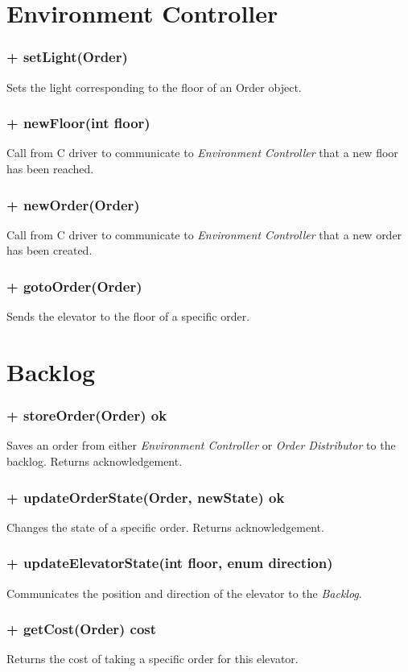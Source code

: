 \documentclass[11pt,a4paper]{article}
\begin{document}
\section*{Environment Controller}
\subsubsection*{+ setLight(Order)}
Sets the light corresponding to the floor of an Order object.
\subsubsection*{+ newFloor(int floor)}
Call from C driver to communicate to \textit{Environment Controller} that a new floor has been reached.
\subsubsection*{+ newOrder(Order)}
Call from C driver to communicate to \textit{Environment Controller} that a new order has been created.
\subsubsection*{+ gotoOrder(Order)}
Sends the elevator to the floor of a specific order.
\section*{Backlog}
\subsubsection*{+ storeOrder(Order) ok}
Saves an order from either \textit{Environment Controller} or \textit{Order Distributor} to the backlog. Returns acknowledgement.
\subsubsection*{+ updateOrderState(Order, newState) ok}
Changes the state of a specific order. Returns acknowledgement.
\subsubsection*{+ updateElevatorState(int floor, enum direction)}
Communicates the position and direction of the elevator to the \textit{Backlog}.
\subsubsection*{+ getCost(Order) cost}
Returns the cost of taking a specific order for this elevator.
\end{document}
